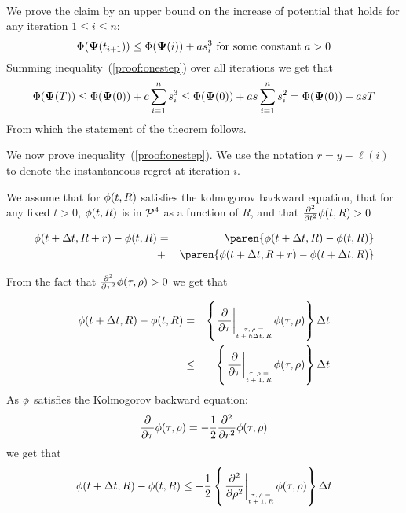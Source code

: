 \documentclass{article}[12pt]
\begin{document}
{\\
We prove the claim by an upper bound on the increase of potential that holds for any iteration $1 \leq i \leq n$:
\begin{equation} \label{proof:onestep}
\Phi({\bf \Psi}(t_{i+1})) \leq \Phi({\bf \Psi}(i)) + a s_i^3 \mbox{ for some constant } a>0
\end{equation}
Summing inequality~(\ref{proof:onestep}) over all iterations we get that 
\begin{equation} \label{proof:allsteps}
\Phi({\bf \Psi}(T)) \leq \Phi({\bf \Psi}(0)) + c \sum_{i=1}^n s_i^3 \leq 
\Phi({\bf \Psi}(0)) + a s \sum_{i=1}^n s_i^2 = 
\Phi({\bf \Psi}(0)) + a s T
\end{equation}
From which the statement of the theorem follows.

We now prove inequality~(\ref{proof:onestep}). 
We use the notation $r=y -\ell(i)$ to denote the instantaneous regret at iteration $i$. 
\fi



We assume that for $\phi(t,R)$ satisfies the kolmogorov backward equation,
that for any fixed $t>0$, $\phi(t,R)$ is in ${\cal P}^{4}$ as a function of $R$, and that
$\frac{\partial^2}{\partial t^2} \phi(t,R) > 0$


\begin{eqnarray} 
  \pot(t+\deltat,\R+r) - \pot(t,\R)
  &=& \paren{\pot(t+\deltat,\R) - \pot(t,\R)} \nonumber\\
  &+& \paren{\pot(t+\deltat,\R+r)-\pot(t+\deltat,\R)} \label{eqn:diffs}
\end{eqnarray}

From the fact that $\frac{\partial^2}{\partial \tau^2} \phi(\tau,\rho) > 0$ we get that 

\begin{eqnarray}
\pot(t+\deltat,\R) - \pot(t,\R) &=& \at{\frac{\partial}{\partial \tau}}{t+h\deltat,R}  \deltat \nonumber \\
  & \leq & \at{\frac{\partial}{\partial \tau}}{t+1,R}  \deltat \label{eqn:interior-point-dt}
\end{eqnarray}
As $\phi$ satisfies the Kolmogorov backward equation:
\begin{equation*} 
  \frac{\partial}{\partial \tau} \phi(\tau,\rho)
  = -\frac{1}{2} \frac{\partial^2}{\partial r^2} \phi(\tau,\rho)
\end{equation*}
we get that
\begin{equation}
  \pot(t+\deltat,\R) - \pot(t,\R) \leq
  -\frac{1}{2} \at{\frac{\partial^2}{\partial \rho^2}}{t+1,R} \deltat
  \label{eqn:usingKol}
\end{equation}

}
\end{document}
